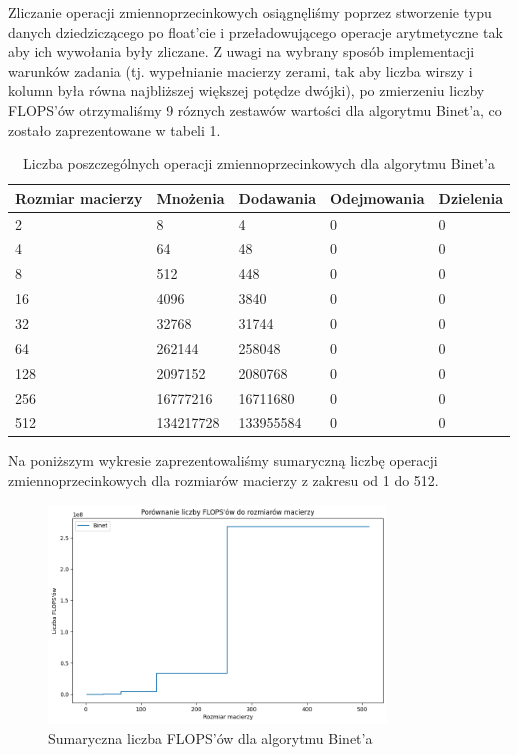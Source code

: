 \documentclass{article}
\begin{document}
Zliczanie operacji zmiennoprzecinkowych osiągnęliśmy poprzez stworzenie typu danych dziedziczącego po float'cie i przeładowującego operacje arytmetyczne tak aby ich wywołania były zliczane. Z uwagi na wybrany sposób implementacji warunków zadania (tj. wypełnianie macierzy zerami, tak aby liczba wirszy i kolumn była równa najbliższej większej potędze dwójki), po zmierzeniu liczby FLOPS'ów otrzymaliśmy 9 róznych zestawów wartości dla algorytmu Binet'a, co zostało zaprezentowane w tabeli 1.

\begin{table}[H]
    \centering
    \begin{tabular}{|l|l|l|l|l|}
    \hline
        Rozmiar macierzy & Mnożenia & Dodawania & Odejmowania & Dzielenia  \\ \hline
        2 & 8 & 4 & 0 & 0  \\ \hline
        4 & 64 & 48 & 0 & 0  \\ \hline
        8 & 512 & 448 & 0 & 0  \\ \hline
        16 & 4096 & 3840 & 0 & 0  \\ \hline
        32 & 32768 & 31744 & 0 & 0  \\ \hline
        64 & 262144 & 258048 & 0 & 0  \\ \hline
        128 & 2097152 & 2080768 & 0 & 0  \\ \hline
        256 & 16777216 & 16711680 & 0 & 0  \\ \hline
        512 & 134217728 & 133955584 & 0 & 0 \\ \hline
    \end{tabular}
    \caption{Liczba poszczególnych operacji zmiennoprzecinkowych dla algorytmu Binet'a}
\end{table}

\noindent
Na poniższym wykresie zaprezentowaliśmy sumaryczną liczbę operacji zmiennoprzecinkowych dla rozmiarów macierzy z zakresu od 1 do 512.

\begin{figure}[H]
  \centering
    \includegraphics[width=0.8\textwidth]{binet_flops.png}
  \caption{Sumaryczna liczba FLOPS'ów dla algorytmu Binet'a}
\end{figure}
\end{document}
